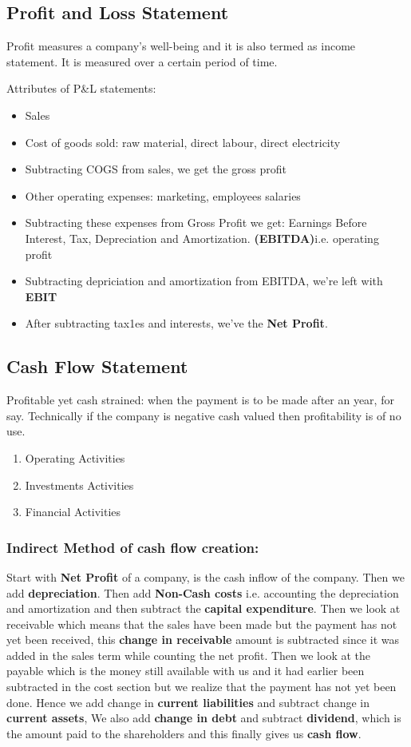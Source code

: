 \documentclass{article}
\begin{document}
\subsection{Profit and Loss Statement}
Profit measures a company's well-being and it is also termed as income statement. It is measured over a certain period of time. \par
Attributes of P\&L statements:
\begin{itemize}
    \item Sales
    \item Cost of goods sold: raw material, direct labour, direct electricity
    \item Subtracting COGS from sales, we get the gross profit
    \item Other operating expenses: marketing, employees salaries
    \item Subtracting these expenses from Gross Profit we get: Earnings Before Interest, Tax, Depreciation and Amortization. \textbf{(EBITDA)}i.e. operating profit 
    \item Subtracting depriciation and amortization from EBITDA, we're left with \textbf{EBIT}
    \item After subtracting tax1es and interests, we've the \textbf{Net Profit}.
\end{itemize}
\subsection{Cash Flow Statement}
Profitable yet cash strained: when the payment is to be made after an year, for say. Technically if the company is negative cash valued then profitability is of no use.
\begin{enumerate}
    \item Operating Activities
    \item Investments Activities
    \item Financial Activities
\end{enumerate}
\subsubsection{Indirect Method of cash flow creation:}
Start with \textbf{Net Profit} of a company, is the cash inflow of the company. Then we add \textbf{depreciation}. Then add \textbf{Non-Cash costs} i.e. accounting the depreciation and amortization and then subtract the \textbf{capital expenditure}. Then we look at receivable which means that the sales have been made but the payment has not yet been received, this \textbf{change in receivable} amount is subtracted since it was added in the sales term while counting the net profit. Then we look at the payable which is the money still available with us and it had earlier been subtracted in the cost section but we realize that the payment has not yet been done. Hence we add change in \textbf{current liabilities} and subtract change in \textbf{current assets}, We also add \textbf{change in debt} and subtract \textbf{dividend}, which is the amount paid to the shareholders and this finally gives us \textbf{cash flow}.  
\end{document}
